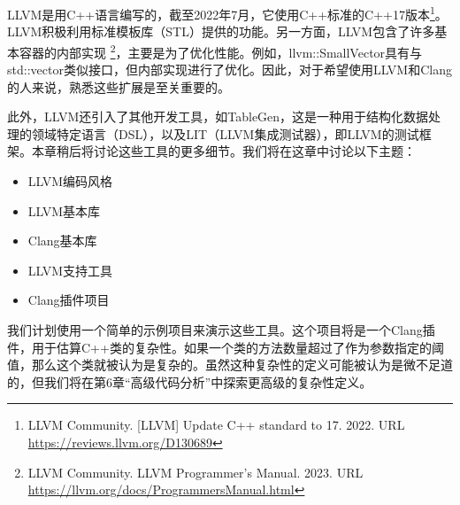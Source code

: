 LLVM是用C++语言编写的，截至2022年7月，它使用C++标准的C++17版本\footnote{LLVM Community. [LLVM] Update C++ standard to 17. 2022. URL \url{https://reviews.llvm.org/D130689}}。LLVM积极利用标准模板库（STL）提供的功能。另一方面，LLVM包含了许多基本容器的内部实现 \footnote{ LLVM Community. LLVM Programmer's Manual. 2023. URL \url{https://llvm.org/docs/ProgrammersManual.html}}，主要是为了优化性能。例如，llvm::SmallVector具有与std::vector类似接口，但内部实现进行了优化。因此，对于希望使用LLVM和Clang的人来说，熟悉这些扩展是至关重要的。

此外，LLVM还引入了其他开发工具，如TableGen，这是一种用于结构化数据处理的领域特定语言（DSL），以及LIT（LLVM集成测试器），即LLVM的测试框架。本章稍后将讨论这些工具的更多细节。我们将在这章中讨论以下主题：

\begin{itemize}
\item
LLVM编码风格

\item
LLVM基本库

\item
Clang基本库

\item
LLVM支持工具

\item
Clang插件项目
\end{itemize}

我们计划使用一个简单的示例项目来演示这些工具。这个项目将是一个Clang插件，用于估算C++类的复杂性。如果一个类的方法数量超过了作为参数指定的阈值，那么这个类就被认为是复杂的。虽然这种复杂性的定义可能被认为是微不足道的，但我们将在第6章“高级代码分析”中探索更高级的复杂性定义。
